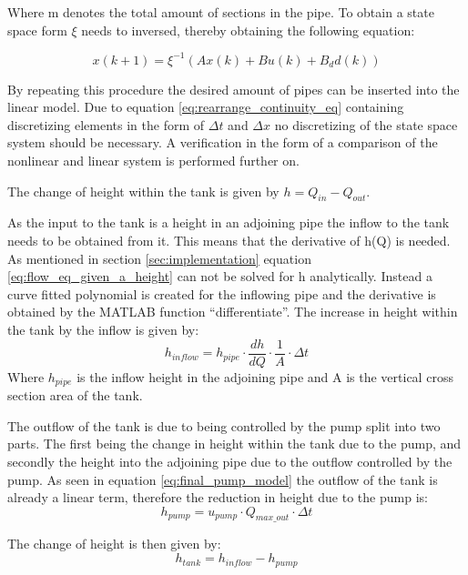 Where m denotes the total amount of sections in the pipe.  
To obtain a state space form $\xi$ needs to inversed, thereby obtaining the following equation:

\begin{equation}
	x(k+1) = \xi^{-1} (Ax(k)+Bu(k)+B_dd(k))
\end{equation}

By repeating this procedure the desired amount of pipes can be inserted into the linear model. Due to equation \ref{eq:rearrange_continuity_eq} containing discretizing elements in the form of $\Delta t$ and $\Delta x$ no discretizing of the state space system should be necessary. A verification in the form of a comparison of the nonlinear and linear system is performed further on. 

The change of height within the tank is given by $h = Q_{in}-Q_{out}$.

As the input to the tank is a height in an adjoining pipe the inflow to the tank needs to be obtained from it. This means that the derivative of h(Q) is needed. As mentioned in section \ref{sec:implementation} equation \ref{eq:flow_eq_given_a_height} can not be solved for h analytically. Instead a curve fitted polynomial is created for the inflowing pipe and the derivative is obtained by the MATLAB function ``differentiate''. The increase in height within the tank by the inflow is given by:
\begin{equation} \label{eq:heigh_in_flow_lin_tank}
	h_{inflow} = h_{pipe} \cdot \frac{dh}{dQ} \cdot \frac{1}{A} \cdot \Delta t 
\end{equation}
Where $h_{pipe}$ is the inflow height in the adjoining pipe and A is the vertical cross section area of the tank.

The outflow of the tank is due to being controlled by the pump split into two parts. The first being the change in height within the tank due to the pump, and secondly the height into the adjoining pipe due to the outflow controlled by the pump. 
As seen in equation \ref{eq:final_pump_model} the outflow of the tank is already a linear term, therefore the reduction in height due to the pump is:
\begin{equation}\label{eq:height_reduc_pump_lin_tank}
 	h_{pump} = u_{pump} \cdot Q_{max\_out} \cdot \Delta t
\end{equation} 

The change of height is then given by:
\begin{equation}
	h_{tank} = h_{inflow} - h_{pump}
\end{equation}

